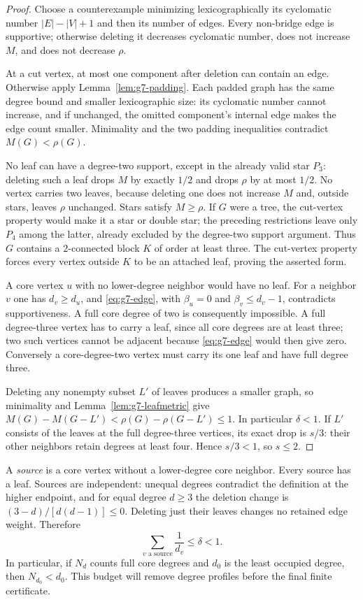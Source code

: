 \documentclass[11pt,a4paper]{article}
\theoremstyle{definition}\newtheorem{definition}[theorem]{Definition}
\theoremstyle{remark}\newtheorem{remark}[theorem]{Remark}
\begin{document}
\begin{proof}
Choose a counterexample minimizing lexicographically its cyclomatic
number $|E|-|V|+1$ and then its number of edges. Every non-bridge edge
is supportive; otherwise deleting it decreases cyclomatic number,
does not increase $M$, and does not decrease $\rho$.

At a cut vertex, at most one component after deletion can contain an
edge. Otherwise apply Lemma~\ref{lem:g7-padding}. Each padded graph
has the same degree bound and smaller lexicographic size: its
cyclomatic number cannot increase, and if unchanged, the omitted
component's internal edge makes the edge count smaller. Minimality
and the two padding inequalities contradict $M(G)<\rho(G)$.

No leaf can have a degree-two support, except in the already valid
star $P_3$: deleting such a leaf drops $M$ by exactly $1/2$ and drops
$\rho$ by at most $1/2$. No vertex carries two leaves, because deleting
one does not increase $M$ and, outside stars, leaves $\rho$ unchanged.
Stars satisfy $M\ge\rho$. If $G$ were a tree, the cut-vertex property
would make it a star or double star; the preceding restrictions leave
only $P_4$ among the latter, already excluded by the degree-two support
argument. Thus $G$ contains a $2$-connected block $K$ of order at least
three. The cut-vertex property forces every vertex outside $K$ to be
an attached leaf, proving the asserted form.

A core vertex $u$ with no lower-degree neighbor would have no leaf.
For a neighbor $v$ one has $d_v\ge d_u$, and
\eqref{eq:g7-edge}, with $\beta_u=0$ and $\beta_v\le d_v-1$, contradicts
supportiveness. A full core degree of two is consequently impossible.
A full degree-three vertex has to carry a leaf, since all core degrees
are at least three; two such vertices cannot be adjacent because
\eqref{eq:g7-edge} would then give zero. Conversely a core-degree-two
vertex must carry its one leaf and have full degree three.

Deleting any nonempty subset $L'$ of leaves produces a smaller graph,
so minimality and Lemma~\ref{lem:g7-leafmetric} give
$M(G)-M(G-L')<\rho(G)-\rho(G-L')\le1$. In particular $\delta<1$.
If $L'$ consists of the leaves at the full degree-three vertices, its
exact drop is $s/3$: their other neighbors retain degrees at least
four. Hence $s/3<1$, so $s\le2$.
\end{proof}

A \emph{source} is a core vertex without a lower-degree core neighbor.
Every source has a leaf. Sources are independent: unequal degrees
contradict the definition at the higher endpoint, and for equal degree
$d\ge3$ the deletion change is $(3-d)/[d(d-1)]\le0$.
Deleting just their leaves changes no retained edge weight. Therefore
\begin{equation}\label{eq:g7-source}
 \sum_{v\text{ a source}}\frac1{d_v}\le\delta<1.
\end{equation}
In particular, if $N_d$ counts full core degrees and $d_0$ is the least
occupied degree, then $N_{d_0}<d_0$. This budget will remove degree
profiles before the final finite certificate.
\end{document}
